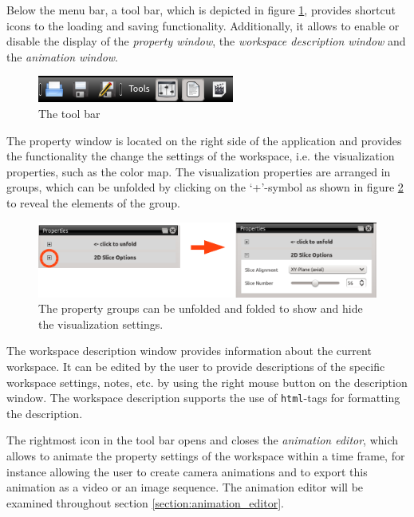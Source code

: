 Below the menu bar, a tool bar, which is depicted in figure \ref{fig:tool_bar}, 
provides shortcut icons to the loading and saving functionality.
Additionally, it allows to enable or disable the display of the \emph{property window}, the \emph{workspace description window} and the \emph{animation window}.

\begin{figure}[htb]
 \centering
 \includegraphics[scale=1.1,keepaspectratio=true]{./images/tool_bar.png}
 \caption{The \Voreen tool bar}
 \label{fig:tool_bar}
\end{figure}

The property window is located on the right side of the application and provides the functionality the change the settings of the workspace, i.e. the visualization
properties, such as the color map. The visualization properties are arranged in groups, which can be unfolded by clicking on the `+'-symbol as shown in figure 
\ref{fig:property_groups} to reveal the elements of the group.

\begin{figure}[htb]
 \centering
 \includegraphics[scale=1.1,keepaspectratio=true]{./images/property_groups.png}
 \caption{The property groups can be unfolded and folded to show and hide the visualization settings.}
 \label{fig:property_groups}
\end{figure}

The workspace description window provides information about the current workspace. It can be edited by the user to provide descriptions of the 
specific workspace settings, notes, etc. by using the right mouse button on the description window. 
The workspace description supports the use of \verb|html|-tags for formatting the description.

The rightmost icon in the tool bar opens and closes the \emph{animation editor}, which allows to animate the property settings of the workspace 
within a time frame, for instance allowing the user to create camera animations and to export this animation as a video or an image sequence.
The animation editor will be examined throughout section \ref{section:animation_editor}.

